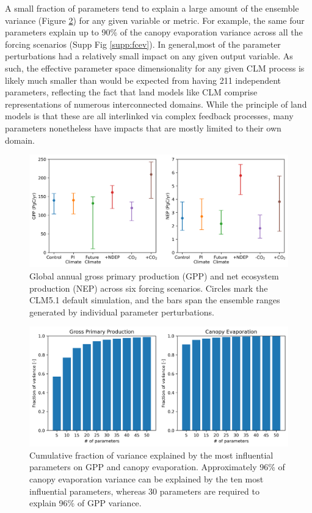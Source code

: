 \documentclass[draft]{agujournal2019}
\begin{document}
A small fraction of parameters tend to explain a large amount of the ensemble variance (Figure \ref{fig:variance}) for any given variable or metric. For example, the same four parameters explain up to 90\% of the canopy evaporation variance across all the forcing scenarios (Supp Fig \ref{supp:fcev}). In general,most of the parameter perturbations had a relatively small impact on any given output variable. As such, the effective parameter space dimensionality for any given CLM process is likely much smaller than would be expected from having 211 independent parameters, reflecting the fact that land models like CLM comprise representations of numerous interconnected domains. While the principle of land models is that these are all interlinked via complex feedback processes, many parameters nonetheless have impacts that are mostly limited to their own domain. 

\begin{figure}[h]
\centering
\includegraphics[width=\textwidth]{../figs/ranges.png}
\caption{Global annual gross primary production (GPP) and net ecosystem production (NEP) across six forcing scenarios. Circles mark the CLM5.1 default simulation, and the bars span the ensemble ranges generated by individual parameter perturbations.}
\label{fig:ranges}
\end{figure}

\begin{figure}[h]
\centering
\includegraphics[width=\textwidth]{../figs/variance.png}
\caption{Cumulative fraction of variance explained by the most influential parameters on GPP and canopy evaporation. Approximately 96\% of canopy evaporation variance can be explained by the ten most influential parameters, whereas 30 parameters are required to explain 96\% of GPP variance.}
\label{fig:variance}
\end{figure}
\end{document}
